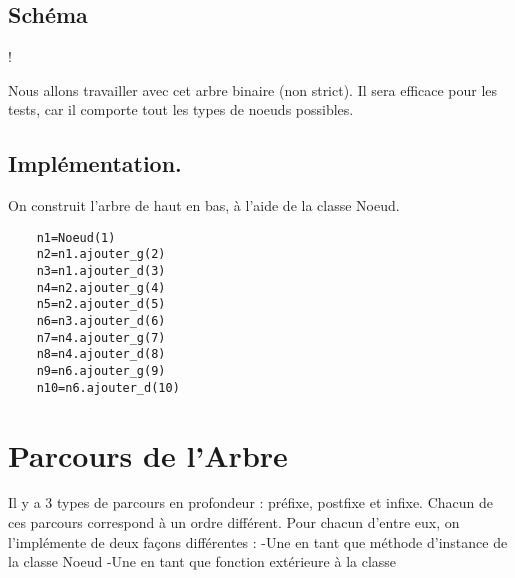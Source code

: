 \documentclass{article}
\begin{document}
\subsection{Schéma}
\begin{center}
\resizebox {\textwidth} {!} {

 }
\end{center}
Nous allons travailler avec cet arbre binaire (non strict). Il sera efficace pour les tests, car il 
comporte tout les types de noeuds possibles.
\subsection{Implémentation.}
On construit l'arbre de haut en bas, à l'aide de la classe Noeud.
\renewcommand{\theFancyVerbLine}{
  \sffamily\textcolor[rgb]{0.5,0.5,0.5}{\scriptsize\arabic{FancyVerbLine}}}

\begin{verbatim}
    n1=Noeud(1)
    n2=n1.ajouter_g(2)
    n3=n1.ajouter_d(3)
    n4=n2.ajouter_g(4)
    n5=n2.ajouter_d(5)
    n6=n3.ajouter_d(6)
    n7=n4.ajouter_g(7)
    n8=n4.ajouter_d(8)
    n9=n6.ajouter_g(9)
    n10=n6.ajouter_d(10)
\end{verbatim}

\newpage
\section{Parcours de l'Arbre}
 Il y a 3 types de parcours en profondeur : préfixe, postfixe et infixe.
 Chacun de ces parcours correspond à un ordre différent.
 Pour chacun d'entre eux, on l'implémente de deux façons différentes :
 \newline
 -Une en tant que méthode d'instance de la classe Noeud
 \newline
 -Une en tant que fonction extérieure à la classe
\end{document}
